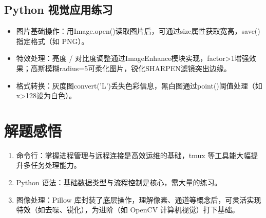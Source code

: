 \documentclass[10.5pt]{ctexart}
\begin{document}
\subsection{Python 视觉应用练习}
\begin{itemize}
\item 图片基础操作：用Image.open()读取图片后，可通过size属性获取宽高，save()指定格式（如 PNG）。
\item 特效处理：亮度 / 对比度调整通过ImageEnhance模块实现，factor>1增强效果；高斯模糊radius=5可柔化图片，锐化SHARPEN滤镜突出边缘。
\item 格式转换：灰度图convert('L')丢失色彩信息，黑白图通过point()阈值处理（如x>128设为白色）。
\end{itemize}

\section{解题感悟}
\begin{enumerate}
    \item 命令行：掌握进程管理与远程连接是高效运维的基础，tmux 等工具能大幅提升多任务处理能力。
    \item Python 语法：基础数据类型与流程控制是核心，需大量的练习。
    \item 图像处理：Pillow 库封装了底层操作，理解像素、通道等概念后，可灵活实现特效（如去噪、锐化），为进阶（如 OpenCV 计算机视觉）打下基础。
\end{enumerate}
\end{document}
